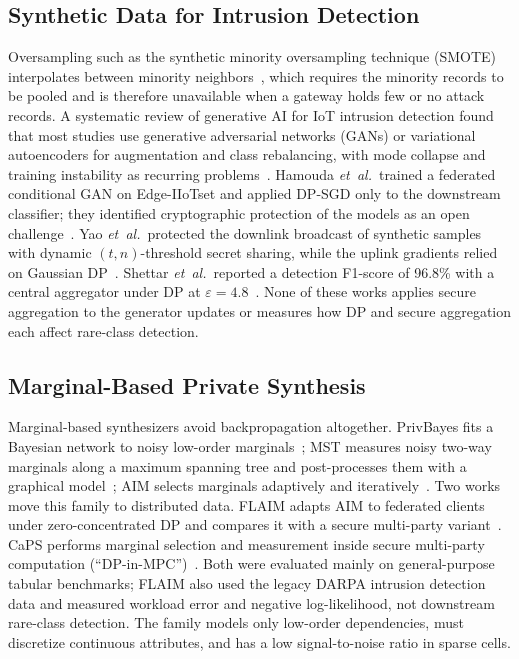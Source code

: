 \documentclass[conference]{IEEEtran}
\begin{document}
\subsection{Synthetic Data for Intrusion Detection}
Oversampling such as the synthetic minority oversampling technique (SMOTE) interpolates between minority neighbors~\cite{chawla2002}, which requires the minority records to be pooled and is therefore unavailable when a gateway holds few or no attack records. A systematic review of generative AI for IoT intrusion detection found that most studies use generative adversarial networks (GANs) or variational autoencoders for augmentation and class rebalancing, with mode collapse and training instability as recurring problems~\cite{deng2025}. Hamouda \textit{et~al.}\ trained a federated conditional GAN on Edge-IIoTset and applied DP-SGD only to the downstream classifier; they identified cryptographic protection of the models as an open challenge~\cite{hamouda2024}. Yao \textit{et~al.}\ protected the downlink broadcast of synthetic samples with dynamic $(t, n)$-threshold secret sharing, while the uplink gradients relied on Gaussian DP~\cite{yao2024}. Shettar \textit{et~al.}\ reported a detection F1-score of 96.8\% with a central aggregator under DP at $\varepsilon = 4.8$~\cite{shettar2026}. None of these works applies secure aggregation to the generator updates or measures how DP and secure aggregation each affect rare-class detection.

\subsection{Marginal-Based Private Synthesis}
Marginal-based synthesizers avoid backpropagation altogether. PrivBayes fits a Bayesian network to noisy low-order marginals~\cite{zhang2017privbayes}; MST measures noisy two-way marginals along a maximum spanning tree and post-processes them with a graphical model~\cite{mckenna2021mst}; AIM selects marginals adaptively and iteratively~\cite{mckenna2024aim}. Two works move this family to distributed data. FLAIM adapts AIM to federated clients under zero-concentrated DP and compares it with a secure multi-party variant~\cite{maddock2024}. CaPS performs marginal selection and measurement inside secure multi-party computation (``DP-in-MPC'')~\cite{pentyala2024}. Both were evaluated mainly on general-purpose tabular benchmarks; FLAIM also used the legacy DARPA intrusion detection data and measured workload error and negative log-likelihood, not downstream rare-class detection. The family models only low-order dependencies, must discretize continuous attributes, and has a low signal-to-noise ratio in sparse cells.
\end{document}
